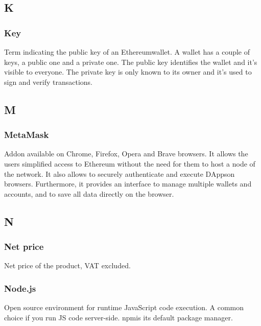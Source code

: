 \subsection*{K}

\subsubsection*{Key}
Term indicating the public key of an Ethereum\glosp wallet\glosp. A wallet has a couple of keys, a public one and a private one. The public key identifies the wallet and it's visible to everyone. The private key is only known to its owner and it's used to sign and verify transactions.




\subsection*{M}

\subsubsection*{MetaMask}
Addon available on Chrome, Firefox, Opera and Brave browsers.
It allows the users simplified access to Ethereum without the need for them to host a node of the network.
It also allows to securely authenticate and execute DApps\glosp on browsers.
Furthermore, it provides an interface to manage multiple wallets and accounts, and to save all data directly on the browser.


\subsection*{N}

\subsubsection*{Net price}
Net price of the product, VAT excluded.

\subsubsection*{Node.js}
Open source environment for runtime JavaScript code execution. A common choice if you run JS code server-side. npm\glosp is its default package manager.

